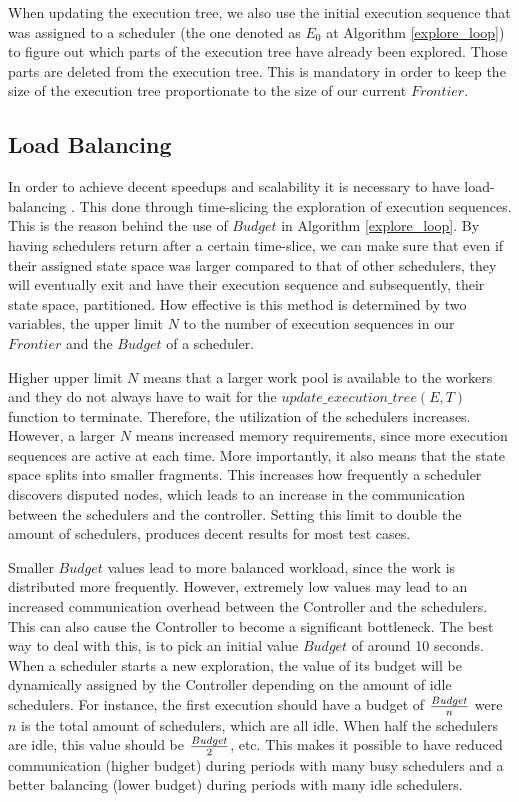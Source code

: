 When updating the execution tree, we also use the initial execution sequence that was assigned to a scheduler
(the one denoted as $E_0$ at Algorithm \ref{explore_loop}) to figure out which parts of the execution tree have
already been explored. Those parts are deleted from the execution tree. 
This is mandatory in order to keep the size of the execution tree proportionate to the size of our current $Frontier$.


\subsection{Load Balancing}

In order to achieve decent speedups and scalability it is necessary to have load-balancing \cite{Simsa2012ScalableDP}.
This done through time-slicing the exploration of execution sequences. This is the reason
behind the use of $Budget$ in Algorithm \ref{explore_loop}. By having schedulers return after a certain time-slice,
we can make sure that even if their assigned state space was larger compared to that of other schedulers, they will
eventually exit and have their execution sequence and subsequently, their state space, partitioned. How effective
is this method is determined by two variables, the upper limit $N$ to the number of execution sequences in our
$Frontier$ and the $Budget$ of a scheduler.

Higher upper limit $N$ means that a larger work pool is available to the workers and they do not always have to wait
for the $update\_execution\_tree(E, T)$ function to terminate. Therefore, the utilization of the schedulers
increases.
However, a larger $N$ means increased memory requirements, since more execution sequences are active at each time. More importantly, 
it also means that the state space splits into smaller fragments. This increases how frequently a scheduler discovers disputed nodes, which
leads to an increase in the communication between the schedulers and the controller.
Setting this limit to double the amount of schedulers, produces decent results for most test cases\cite{Simsa2012ScalableDP}.

Smaller $Budget$ values lead to more balanced workload, since the work is distributed more frequently. However,
extremely low values may lead to an increased communication overhead between the Controller and the schedulers.
This can also cause the Controller to become a significant bottleneck. The best way to deal with this,
is to pick an initial value $Budget$ of around 10 seconds. When a scheduler starts a new exploration,
the value of its budget will be dynamically assigned by the Controller depending on the amount of
idle schedulers. For instance, the first execution should have a budget of $Budget \over n$ were $n$ is the total amount of
schedulers, which are all idle. When half the schedulers are idle, this value should be $Budget \over 2$, etc. This makes it possible to have
reduced communication (higher budget) during periods with many busy schedulers and a better balancing
(lower budget) during periods with many idle schedulers.

